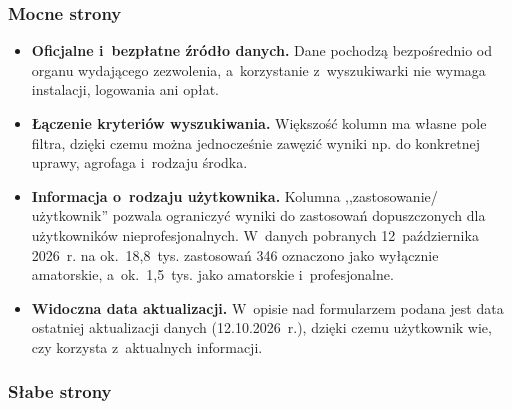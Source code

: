 \subsubsection{Mocne strony}

\begin{itemize}
    \item \textbf{Oficjalne i~bezpłatne źródło danych.}
    Dane pochodzą bezpośrednio od organu wydającego zezwolenia, a~korzystanie
    z~wyszukiwarki nie wymaga instalacji, logowania ani opłat.

    \item \textbf{Łączenie kryteriów wyszukiwania.}
    Większość kolumn ma własne pole filtra, dzięki czemu można jednocześnie
    zawęzić wyniki np. do konkretnej uprawy, agrofaga i~rodzaju środka.

    \item \textbf{Informacja o~rodzaju użytkownika.}
    Kolumna ,,zastosowanie/ użytkownik'' pozwala ograniczyć wyniki do
    zastosowań dopuszczonych dla użytkowników nieprofesjonalnych. W~danych
    pobranych 12~października 2026~r. na ok.~18,8~tys. zastosowań 346
    oznaczono jako wyłącznie amatorskie, a~ok.~1,5~tys. jako amatorskie
    i~profesjonalne.

    \item \textbf{Widoczna data aktualizacji.}
    W~opisie nad formularzem podana jest data ostatniej aktualizacji danych
    (12.10.2026~r.), dzięki czemu użytkownik wie, czy korzysta z~aktualnych
    informacji.
\end{itemize}

\subsubsection{Słabe strony}

